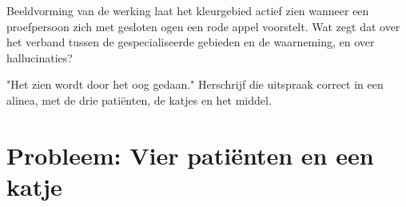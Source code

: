 \begin{exercise}[$\star\star\star$]\label{exo:g11:vision-and-brain:14}
Beeldvorming van de werking laat het kleurgebied actief zien wanneer een
proefpersoon zich met gesloten ogen een rode appel voorstelt. Wat zegt dat
over het verband tussen de gespecialiseerde gebieden en de waarneming, en
over hallucinaties?
\end{exercise}

\begin{exercise}[$\star\star\star$]\label{exo:g11:vision-and-brain:15}
"Het zien wordt door het oog gedaan." Herschrijf die uitspraak correct in
een alinea, met de drie patiënten, de katjes en het middel.
\end{exercise}

\section{Probleem: Vier patiënten en een katje}

